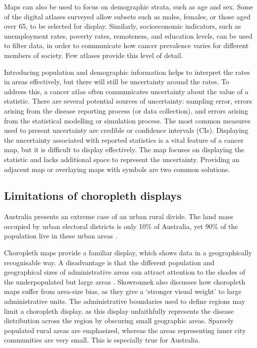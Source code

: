 \documentclass{monashthesis}
\begin{document}
Maps can also be used to focus on demographic strata, such as age and sex. Some of the digital atlases surveyed allow subsets such as males, females, or those aged over 65, to be selected for display. Similarly, socioeconomic indicators, such as unemployment rates, poverty rates, remoteness, and education levels, can be used to filter data, in order to communicate how cancer prevalence varies for different members of society. Few atlases provide this level of detail.

Introducing population and demographic information helps to interpret the rates in areas effectively, but there will still be uncertainty around the rates. To address this, a cancer atlas often communicates uncertainty about the value of a statistic. There are several potential sources of uncertainty: sampling error, errors arising from the disease reporting process (or data collection), and errors arising from the statistical modelling or simulation process. The most common measures used to present uncertainty are credible or confidence intervals (CIs). Displaying the uncertainty associated with reported statistics is a vital feature of a cancer map, but it is difficult to display effectively. The map focuses on displaying the statistic and lacks additional space to represent the uncertainty. Providing an adjacent map or overlaying maps with symbols \autocite{VSSDCUC} are two common solutions.

\hypertarget{ch:chorolimit}{%
\subsection{Limitations of choropleth displays}\label{ch:chorolimit}}

Australia presents an extreme case of an urban rural divide. The land mass occupied by urban electoral districts is only 10\% of Australia, yet 90\% of the population live in these urban areas \autocite{ACTUC}.

Choropleth maps provide a familiar display, which shows data in a geographically recognisable way. A disadvantage is that the different population and geographical sizes of administrative areas can attract attention to the shades of the underpopulated but large areas \autocite{EI}. Skowronnek also \autocite{BCM} discusses how choropleth maps suffer from area-size bias, as they give a `stronger visual weight' to large administrative units. The administrative boundaries used to define regions may limit a choropleth display, as this display unfaithfully represents the disease distribution across the region by obscuring small geographic areas. Sparsely populated rural areas are emphasized, whereas the areas representing inner city communities are very small. This is especially true for Australia.
\end{document}
